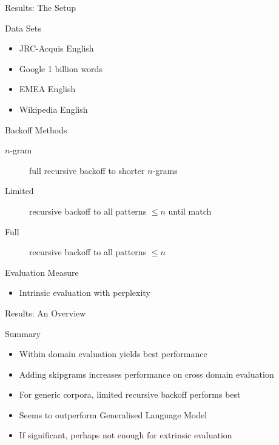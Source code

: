 \begin{frame}{Results: The Setup}
    \begin{block}{Data Sets}
        \begin{itemize}
            \item JRC-Acquis English
            \item Google 1 billion words
            \item EMEA English
            \item Wikipedia English
        \end{itemize}
    \end{block}

    \begin{block}{Backoff Methods}
        \begin{description}
            \item[$n$-gram] full recursive backoff to shorter $n$-grams
            \item[Limited] recursive backoff to all patterns $\leq n$ until match
            \item[Full] recursive backoff to all patterns $\leq n$
        \end{description}
    \end{block}

    \begin{block}{Evaluation Measure}
        \begin{itemize}
            \item Intrinsic evaluation with perplexity
        \end{itemize}
    \end{block}
\end{frame}
\note[itemize]{
}

\begin{frame}{Results: An Overview}
    \begin{block}{Summary}
        \begin{itemize}
            \item Within domain evaluation yields best performance
            \item Adding skipgrams increases performance on cross domain evaluation
            \item For generic corpora, limited recursive backoff performs best
            \item Seems to outperform Generalised Language Model
            \item If significant, perhaps not enough for extrinsic evaluation
        \end{itemize}
    \end{block}
\end{frame}
\note[itemize]{
}

